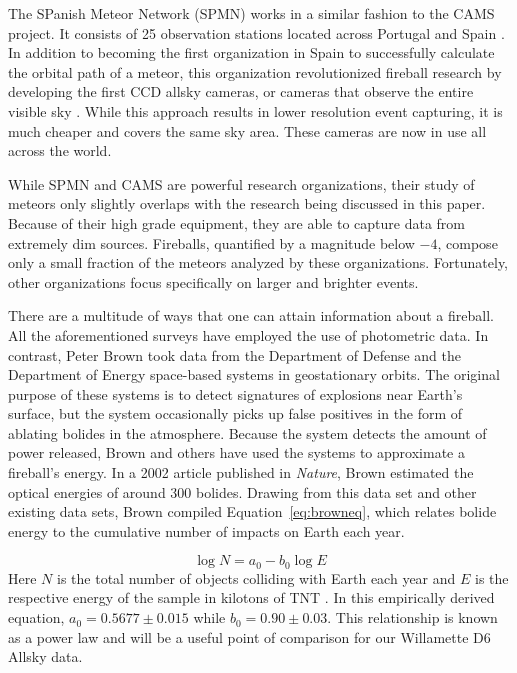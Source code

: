 The SPanish Meteor Network (SPMN) works in a similar fashion to the CAMS project.  
It consists of 25 observation stations located across Portugal and Spain \cite{trigo-rodriguez_2006_2007}.
In addition to becoming the first organization in Spain to successfully calculate the orbital path of a meteor, this organization revolutionized fireball research by developing the first CCD allsky cameras, or cameras that observe the entire visible sky \cite{jordi_l._pique_presentation_nodate}.
While this approach results in lower resolution event capturing, it is much cheaper and covers the same sky area.
These cameras are now in use all across the world.

While SPMN and CAMS are powerful research organizations, their study of meteors only slightly overlaps with the research being discussed in this paper.
Because of their high grade equipment, they are able to capture data from extremely dim sources.
Fireballs, quantified by a magnitude below $-4$, compose only a small fraction of the meteors analyzed by these organizations.
Fortunately, other organizations focus specifically on larger and brighter events.

There are a multitude of ways that one can attain information about a fireball.  
All the aforementioned surveys have employed the use of photometric data.
In contrast, Peter Brown took data from the Department of Defense and the Department of Energy space-based systems in geostationary orbits.
The original purpose of these systems is to detect signatures of explosions near Earth's surface, but the system occasionally picks up false positives in the form of ablating bolides in the atmosphere.  
Because the system detects the amount of power released, Brown and others have used the systems to approximate a fireball's energy.
In a 2002 article published in \textit{Nature}, Brown estimated the optical energies of around 300 bolides.
Drawing from this data set and other existing data sets, Brown compiled Equation~\ref{eq:browneq}, which relates bolide energy to the cumulative number of impacts on Earth each year. 

\begin{equation}
\log N = a_0 - b_0\log E
\label{eq:browneq}
\end{equation}
Here $N$ is the total number of objects colliding with Earth each year and $E$ is the respective energy of the sample in kilotons of TNT \cite{brown_p_flux_2002}.
In this empirically derived equation, $a_0 = 0.5677 \pm 0.015$ while $b_0 = 0.90 \pm 0.03$.
This relationship is known as a power law and will be a useful point of comparison for our Willamette D6 Allsky data.



